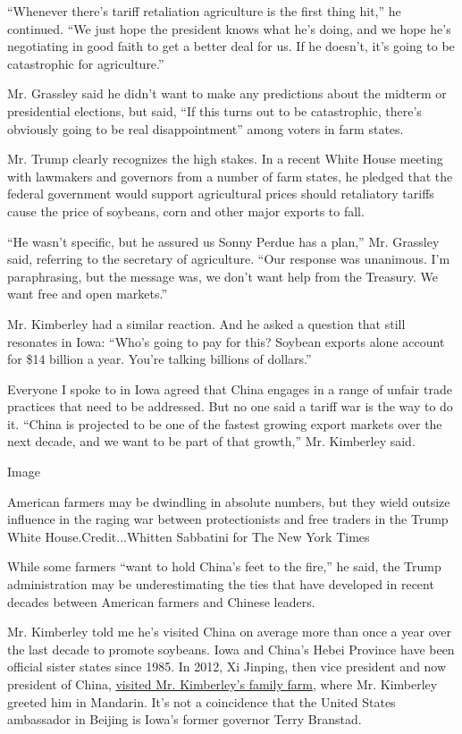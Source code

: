 ``Whenever there's tariff retaliation agriculture is the first thing
hit,'' he continued. ``We just hope the president knows what he's doing,
and we hope he's negotiating in good faith to get a better deal for us.
If he doesn't, it's going to be catastrophic for agriculture.''

Mr. Grassley said he didn't want to make any predictions about the
midterm or presidential elections, but said, ``If this turns out to be
catastrophic, there's obviously going to be real disappointment'' among
voters in farm states.

Mr. Trump clearly recognizes the high stakes. In a recent White House
meeting with lawmakers and governors from a number of farm states, he
pledged that the federal government would support agricultural prices
should retaliatory tariffs cause the price of soybeans, corn and other
major exports to fall.

``He wasn't specific, but he assured us Sonny Perdue has a plan,'' Mr.
Grassley said, referring to the secretary of agriculture. ``Our response
was unanimous. I'm paraphrasing, but the message was, we don't want help
from the Treasury. We want free and open markets.''

Mr. Kimberley had a similar reaction. And he asked a question that still
resonates in Iowa: ``Who's going to pay for this? Soybean exports alone
account for \$14 billion a year. You're talking billions of dollars.''

Everyone I spoke to in Iowa agreed that China engages in a range of
unfair trade practices that need to be addressed. But no one said a
tariff war is the way to do it. ``China is projected to be one of the
fastest growing export markets over the next decade, and we want to be
part of that growth,'' Mr. Kimberley said.

Image

American farmers may be dwindling in absolute numbers, but they wield
outsize influence in the raging war between protectionists and free
traders in the Trump White House.Credit...Whitten Sabbatini for The New
York Times

While some farmers ``want to hold China's feet to the fire,'' he said,
the Trump administration may be underestimating the ties that have
developed in recent decades between American farmers and Chinese
leaders.

Mr. Kimberley told me he's visited China on average more than once a
year over the last decade to promote soybeans. Iowa and China's Hebei
Province have been official sister states since 1985. In 2012, Xi
Jinping, then vice president and now president of China,
\href{https://www.nytimes.com/2016/12/09/world/asia/china-iowa-farm-branstad-xi.html}{visited
Mr. Kimberley's family farm}, where Mr. Kimberley greeted him in
Mandarin. It's not a coincidence that the United States ambassador in
Beijing is Iowa's former governor Terry Branstad.

